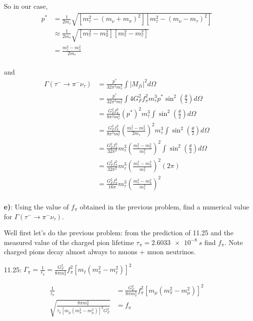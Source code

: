 So in our case,
\begin{align*}
    p^* &= \frac{1}{2m_\tau}\sqrt{\left[m_\tau^2 - (m_\nu+m_\pi)^2\right]\left[m_\tau^2 - (m_\nu-m_\tau)^2\right]} \\
    &\approx \frac{1}{2m_\tau}\sqrt{\left[m_\tau^2 - m_\pi^2\right]\left[m_\tau^2 - m_\tau^2\right]} \\
    &= \frac{m_\tau^2 - m_\pi^2}{2m_\tau} \\
\end{align*}

and
\begin{align*}
    \Gamma(\tau^- \to \pi^- \nu_\tau) &= \frac{p^*}{32\pi^2 m_\tau^2} \int |M_{fi}|^2 d\Omega \\
    &= \frac{p^*}{32\pi^2 m_\tau^2} \int 4 G_F^2 f_\pi^2 m_\tau^3 p^* \sin^2\left(\frac{\theta}{2}\right) d\Omega \\
    &= \frac{G_F^2 f_\pi^2}{8\pi^2 m_\tau^2} (p^*)^2  m_\tau^3 \int\sin^2\left(\frac{\theta}{2}\right) d\Omega \\
    &= \frac{G_F^2 f_\pi^2}{8\pi^2 m_\tau^2} \left(\frac{m_\tau^2 - m_\pi^2}{2m_\tau}\right)^2  m_\tau^3 \int\sin^2\left(\frac{\theta}{2}\right) d\Omega \\
    &= \frac{G_F^2 f_\pi^2}{32\pi^2} m_\tau^3 \left(\frac{m_\tau^2 - m_\pi^2}{m_\tau^2}\right)^2 \int\sin^2\left(\frac{\theta}{2}\right) d\Omega \\
    &= \frac{G_F^2 f_\pi^2}{32\pi^2} m_\tau^3 \left(\frac{m_\tau^2 - m_\pi^2}{m_\tau^2}\right)^2 (2\pi) \\
    &= \frac{G_F^2 f_\pi^2}{16\pi} m_\tau^3 \left(\frac{m_\tau^2 - m_\pi^2}{m_\tau^2}\right)^2 \\
\end{align*}


\textbf{e)}: Using the value of $f_\pi$ obtained in the previous problem, find a numerical value for $\Gamma(\tau^- \to \pi^- \nu_\tau)$.

Well first let's do the previous problem: from the prediction of 11.25 and the measured value of the charged pion lifetime $\tau_\pi = \SI{2.6033e-8}{s}$ find $f_\pi$. Note charged pions decay almost always to muons + muon neutrinos.

11.25: $\Gamma_\pi = \frac{1}{\tau_\pi} = \frac{G_F^2}{8\pi m_\pi^3} f_\pi^2 [m_\ell(m_\pi^2 - m_\ell^2)]^2$

\begin{align*}
    \frac{1}{\tau_\pi} &= \frac{G_F^2}{8\pi m_\pi^3} f_\pi^2 [m_\mu(m_\pi^2 - m_\mu^2)]^2 \\
    \sqrt{\frac{8\pi m_\pi^3}{\tau_\pi[m_\mu(m_\pi^2 - m_\mu^2)]^2G_F^2}} &= f_\pi \\
\end{align*}

